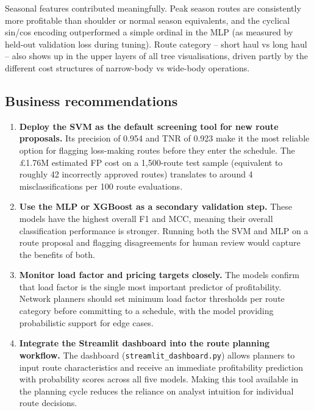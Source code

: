 \documentclass[12pt,a4paper]{article}
\begin{document}
Seasonal features contributed meaningfully. Peak season routes are consistently more profitable than shoulder or normal season equivalents, and the cyclical sin/cos encoding outperformed a simple ordinal in the MLP (as measured by held-out validation loss during tuning). Route category -- short haul vs long haul -- also shows up in the upper layers of all tree visualisations, driven partly by the different cost structures of narrow-body vs wide-body operations.

\subsection{Business recommendations}
\label{subsec:recommendations}

\begin{enumerate}[leftmargin=*]
  \item \textbf{Deploy the SVM as the default screening tool for new route proposals.} Its precision of 0.954 and TNR of 0.923 make it the most reliable option for flagging loss-making routes before they enter the schedule. The £1.76M estimated FP cost on a 1,500-route test sample (equivalent to roughly 42 incorrectly approved routes) translates to around 4 misclassifications per 100 route evaluations.

  \item \textbf{Use the MLP or XGBoost as a secondary validation step.} These models have the highest overall F1 and MCC, meaning their overall classification performance is stronger. Running both the SVM and MLP on a route proposal and flagging disagreements for human review would capture the benefits of both.

  \item \textbf{Monitor load factor and pricing targets closely.} The models confirm that load factor is the single most important predictor of profitability. Network planners should set minimum load factor thresholds per route category before committing to a schedule, with the model providing probabilistic support for edge cases.

  \item \textbf{Integrate the Streamlit dashboard into the route planning workflow.} The dashboard (\texttt{streamlit\_dashboard.py}) allows planners to input route characteristics and receive an immediate profitability prediction with probability scores across all five models. Making this tool available in the planning cycle reduces the reliance on analyst intuition for individual route decisions.
\end{enumerate}
\end{document}
